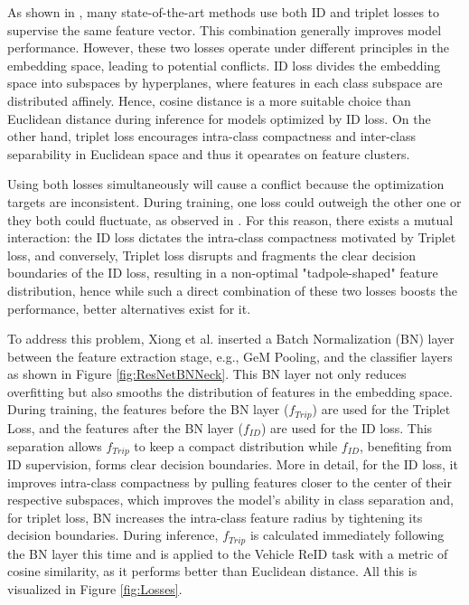 As shown in \cite{StrongBaselineBatchNorm}, many state-of-the-art methods use both ID and triplet losses to supervise the same feature vector. This combination generally improves model performance. However, these two losses operate under different principles in the embedding space, leading to potential conflicts. ID loss divides the embedding space into subspaces by hyperplanes, where features in each class subspace are distributed affinely. Hence, cosine distance is a more suitable choice than Euclidean distance during inference for models optimized by ID loss. On the other hand, triplet loss encourages intra-class compactness and inter-class separability in Euclidean space and thus it opearates on feature clusters.

Using both losses simultaneously will cause a conflict because the optimization targets are inconsistent. During training, one loss could outweigh the other one or they both could fluctuate, as observed in \cite{StrongBaselineBatchNorm}. For this reason, there exists a mutual interaction: the ID loss dictates the intra-class compactness motivated by Triplet loss, and conversely, Triplet loss disrupts and fragments the clear decision boundaries of the ID loss, resulting in a non-optimal "tadpole-shaped" feature distribution, hence while such a direct combination of these two losses boosts the performance, better alternatives exist for it.

To address this problem, Xiong et al. \cite{StrongBaselineBatchNorm} inserted a Batch Normalization (BN) layer between the feature extraction stage, e.g., GeM Pooling, and the classifier layers as shown in Figure \ref{fig:ResNetBNNeck}. This BN layer not only reduces overfitting but also smooths the distribution of features in the embedding space.  During training, the features before the BN layer ($f_{Trip}$) are used for the Triplet Loss, and the features after the BN layer ($f_{ID}$) are used for the ID loss. This separation allows $f_{Trip}$ to keep a compact distribution while $f_{ID}$, benefiting from ID supervision, forms clear decision boundaries. More in detail, for the ID loss, it improves intra-class compactness by pulling features closer to the center of their respective subspaces, which improves the model's ability in class separation and, for triplet loss, BN increases the intra-class feature radius by tightening its decision boundaries. During inference, $f_{Trip}$ is calculated immediately following the BN layer this time and is applied to the Vehicle ReID task with a metric of cosine similarity, as it performs better than Euclidean distance. All this is visualized in Figure \ref{fig:Losses}.

